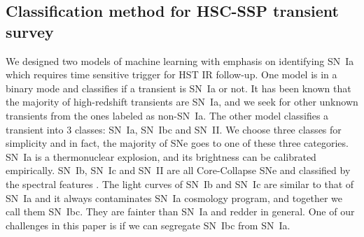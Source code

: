 \documentclass[useamsfonts]{pasj01}
\begin{document}



\subsection{Classification method for HSC-SSP transient survey}
We designed two models of machine learning with emphasis on identifying SN~Ia which requires time sensitive trigger for HST IR follow-up.  One model is in a binary mode and classifies if a transient is SN~Ia or not.
It has been known that the majority of high-redshift transients are SN~Ia, and we seek for other unknown transients
from the ones labeled as non-SN~Ia.   
The other model classifies a transient into 3 classes: SN~Ia, SN~Ibc and SN~II.  
We choose three classes for simplicity and in fact, the majority of SNe goes to one of these three categories.
SN~Ia is a thermonuclear explosion, and its brightness can be calibrated empirically.
SN~Ib, SN~Ic and SN~II are all Core-Collapse SNe and classified by the spectral features \citep{filippenko97a}.
The light curves of SN~Ib and SN~Ic are similar to that of SN~Ia and it always contaminates SN~Ia cosmology program, and together we call them SN~Ibc.  They are fainter than SN~Ia and redder in general.
One of our challenges in this paper is if we can segregate SN~Ibc from SN~Ia.
%
%
%
%
%
%
\end{document}
